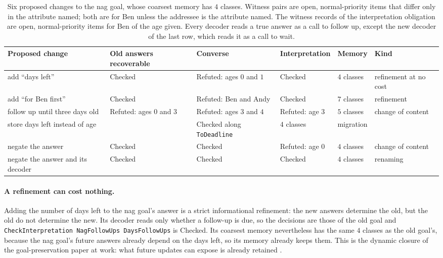 \documentclass[11pt]{article}
\newcommand{\code}[1]{\texttt{#1}}
\theoremstyle{definition}
\theoremstyle{plain}
\begin{document}
\begin{table}[ht]
\centering\small
\begin{tabularx}{\textwidth}{>{\raggedright\arraybackslash}p{3.05cm}>{\raggedright\arraybackslash}p{2.0cm}>{\raggedright\arraybackslash}p{2.15cm}>{\raggedright\arraybackslash}X>{\raggedright\arraybackslash}p{1.35cm}>{\raggedright\arraybackslash}p{1.85cm}}
\toprule
Proposed change & Old answers recoverable & Converse & Interpretation & Memory & Kind\\
\midrule
add ``days left'' & Checked & Refuted: ages $0$ and $1$ & Checked & $4$ classes & refinement at
no cost\\
add ``for Ben first'' & Checked & Refuted: Ben and Andy & Checked & $7$ classes & refinement\\
follow up until three days old & Refuted: ages $0$ and $3$ & Refuted: ages $3$ and $4$ & Refuted:
age $3$ & $5$ classes & change of content\\
store days left instead of age &
\multicolumn{2}{>{\raggedright\arraybackslash}p{4.57cm}}{\code{CheckAbstractionMap ToDeadline}:
Checked} & Checked along \code{ToDeadline} & $4$ classes & migration\\
negate the answer & Checked & Checked & Refuted: age $0$ & $4$ classes & change of content\\
negate the answer and its decoder & Checked & Checked & Checked & $4$ classes & renaming\\
\bottomrule
\end{tabularx}
\caption{Six proposed changes to the nag goal, whose coarsest memory has $4$ classes. Witness
pairs are open, normal-priority items that differ only in the attribute named; both are for Ben
unless the addressee is the attribute named. The witness records of the interpretation obligation
are open, normal-priority items for Ben of the age given. Every decoder reads a true answer as a
call to follow up, except the new decoder of the last row, which reads it as a call to
wait.}\label{tab:p5change}
\end{table}

\paragraph{A refinement can cost nothing.} Adding the number of days left to the nag goal's answer
is a strict informational refinement: the new answers determine the old, but the old do not
determine the new. Its decoder reads only whether a follow-up is due, so the decisions are those of
the old goal and \code{CheckInterpretation NagFollowUps DaysFollowUps} is Checked. Its coarsest
memory nevertheless has the same $4$ classes as the old goal's, because the nag goal's future
answers already depend on the days left, so its memory already keeps them. This is the dynamic
closure of the goal-preservation paper at work: what future updates can expose is already retained
\cite{goalpres}.
\end{document}
